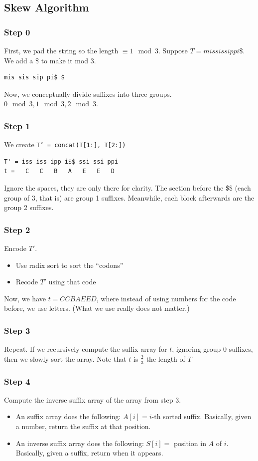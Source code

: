 \documentclass[10pt]{article}
\begin{document}
\subsection*{Skew Algorithm}
\subsubsection*{Step 0}
First, we pad the string so the length $\equiv 1 \mod 3$.  Suppose $T = mississippi\$$.  We add a \$ to make it mod 3.
\begin{verbatim}
mis sis sip pi$ $
\end{verbatim}
Now, we conceptually divide suffixes into three groups.  $0 \mod 3, 1 \mod 3, 2 \mod 3$. 

\subsubsection*{Step 1}
We create \texttt{T' = concat(T[1:], T[2:])}
\begin{verbatim}
T' = iss iss ipp i$$ ssi ssi ppi
t =   C   C   B   A   E   E   D
\end{verbatim}
Ignore the spaces, they are only there for clarity.  The section before the \$\$ (each group of 3, that is) are group 1 suffixes.  Meanwhile, each block afterwards are the group 2 suffixes.

\subsubsection*{Step 2}
Encode $T'$.
\begin{itemize}
	\item Use radix sort to sort the ``codons''
	\item Recode $T'$ using that code
\end{itemize}
Now, we have $t = CCBAEED$, where instead of using numbers for the code before, we use letters.  (What we use really does not matter.)

\subsubsection*{Step 3}
Repeat.  If we recursively compute the suffix array for $t$, ignoring group 0 suffixes, then we slowly sort the array.  Note that $t$ is $\frac{2}{3}$ the length of $T$

\subsubsection*{Step 4}
Compute the inverse suffix array of the array from step 3.
\begin{itemize}
	\item An suffix array does the following: $A[i] = i$-th sorted suffix.  Basically, given a number, return the suffix at that position.
	\item An inverse suffix array does the following: $S[i] = $ position in $A$ of $i$.  Basically, given a suffix, return when it appears.
\end{itemize}
\end{document}
